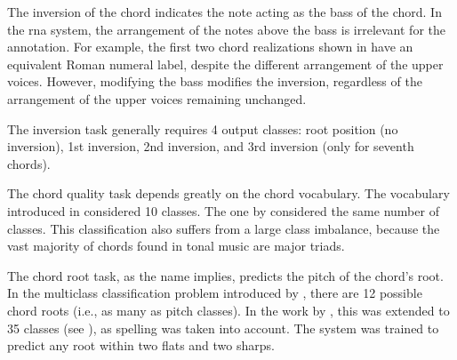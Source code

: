 
The inversion of the chord indicates the note acting as the
bass of the chord. In the \gls{rna} system, the arrangement
of the notes above the bass is irrelevant for the
annotation. For example, the first two chord realizations
shown in  have an equivalent Roman numeral
label, despite the different arrangement of the upper
voices. However, modifying the bass modifies the inversion,
regardless of the arrangement of the upper voices remaining
unchanged.


The inversion task generally requires 4 output classes: root
position (no inversion), 1st inversion, 2nd inversion, and
3rd inversion (only for seventh chords).


The chord quality task depends greatly on the chord
vocabulary. The vocabulary introduced in
\textcite{chen2018functional} considered 10 classes. The one
by \textcite{micchi2020not} considered the same number of
classes. This classification also suffers from a large class
imbalance, because the vast majority of chords found in
tonal music are major triads.


The chord root task, as the name implies, predicts the pitch
of the chord's root. In the multiclass classification
problem introduced by \textcite{chen2018functional}, there
are 12 possible chord roots (i.e., as many as pitch
classes). In the work by \textcite{micchi2020not}, this was
extended to 35 classes (see
), as spelling was
taken into account. The system was trained to predict any
root within two flats and two sharps. 
